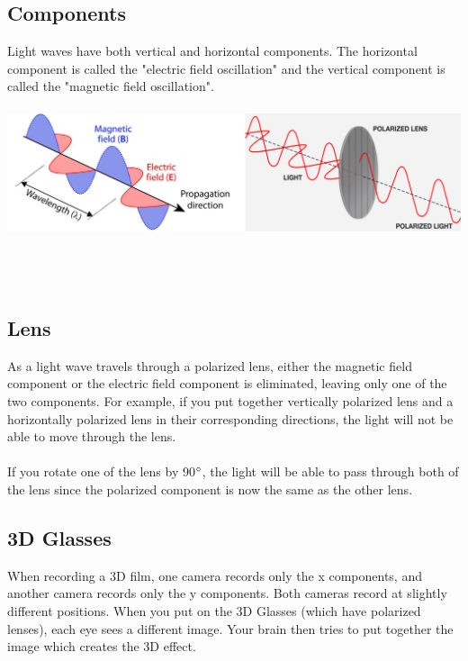 \documentclass{article}
\begin{document}
\subsection{Components}
Light waves have both vertical and horizontal components. The horizontal component is called the "electric field oscillation" and the vertical component is called the "magnetic field oscillation".\\\\
\includegraphics[scale=0.45]{images/polarization} \\\\\\\\

\subsection{Lens}
\noindent As a light wave travels through a polarized lens, either the magnetic field component or the electric field component is eliminated, leaving only one of the two components.
For example, if you put together vertically polarized lens and a horizontally polarized lens in their corresponding directions, the light will not be able to move through the lens.
\\\\If you rotate one of the lens by 90$\degree$, the light will be able to pass through both of the lens since the polarized component is now the same as the other lens.

\subsection{3D Glasses}
When recording a 3D film, one camera records only the x components, and another camera records only the y components. Both cameras record at slightly different positions.
When you put on the 3D Glasses (which have polarized lenses), each eye sees a different image. Your brain then tries to put together the image which creates the 3D effect.
\end{document}
